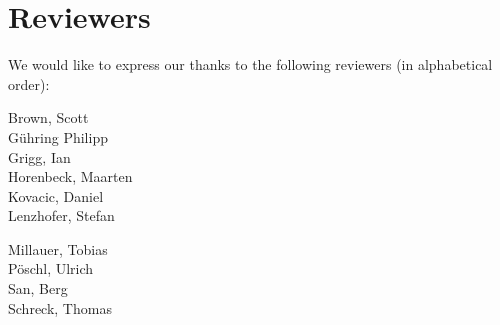 \section{Reviewers}
\label{section:Reviewers}

We would like to express our thanks to the following reviewers (in alphabetical order):


\vline{}

\begin{minipage}[b]{0.5\linewidth}
\center
Brown, Scott \\
G\"uhring Philipp  \\
Grigg, Ian  \\
Horenbeck, Maarten \\
Kovacic, Daniel \\
Lenzhofer, Stefan \\
\end{minipage}
\begin{minipage}[b]{0.5\linewidth}
\center
Millauer, Tobias \\
P\"oschl, Ulrich \\
San, Berg \\
Schreck, Thomas  \\
\end{minipage}




